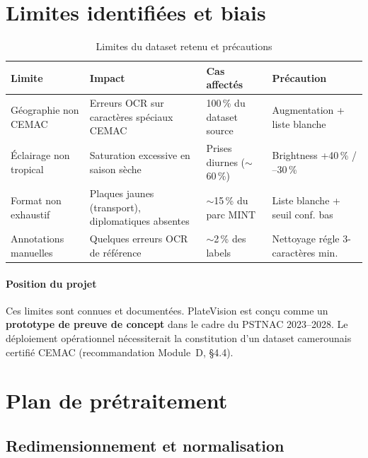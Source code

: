 \documentclass[12pt,a4paper]{article}
\begin{document}
\section{Limites identifi\'{e}es et biais}
\label{sec:dsd:limites}

\begin{table}[H]
\centering
\caption{Limites du dataset retenu et pr\'{e}cautions}
\label{tab:dsd:limites}
\begin{tabular}{p{3cm}p{3.5cm}p{3.5cm}p{3cm}}
\toprule
\textbf{Limite} & \textbf{Impact} & \textbf{Cas affect\'{e}s} & \textbf{Pr\'{e}caution} \\
\midrule
G\'{e}ographie non CEMAC
  & Erreurs OCR sur caract\`{e}res sp\'{e}ciaux CEMAC
  & 100\,\% du dataset source
  & Augmentation + liste blanche \\
\'{E}clairage non tropical
  & Saturation excessive en saison s\`{e}che
  & Prises diurnes ($\sim$60\,\%)
  & Brightness +40\,\% / --30\,\% \\
Format non exhaustif
  & Plaques jaunes (transport), diplomatiques absentes
  & $\sim$15\,\% du parc MINT
  & Liste blanche + seuil conf. bas \\
Annotations manuelles
  & Quelques erreurs OCR de r\'{e}f\'{e}rence
  & $\sim$2\,\% des labels
  & Nettoyage r\'{e}gle 3-caract\`{e}res min. \\
\bottomrule
\end{tabular}
\end{table}

\paragraph{Position du projet}
Ces limites sont connues et document\'{e}es. PlateVision est con\c{c}u comme
un \textbf{prototype de preuve de concept} dans le cadre du PSTNAC 2023--2028.
Le d\'{e}ploiement op\'{e}rationnel n\'{e}cessiterait la constitution d'un
dataset camerounais certifi\'{e} CEMAC (recommandation Module~D, §4.4).

\section{Plan de pr\'{e}traitement}
\label{sec:dsd:pretraitement}

\subsection{Redimensionnement et normalisation}
\end{document}
